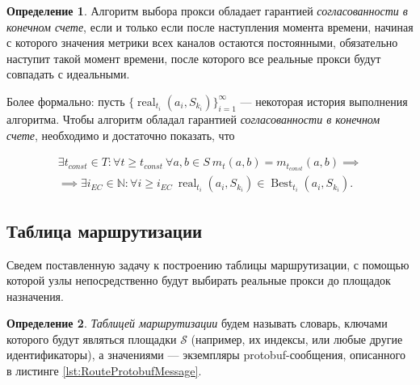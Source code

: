 \documentclass{article}
\theoremstyle{plain}
\theoremstyle{plain}
\theoremstyle{plain}
\theoremstyle{plain}
\theoremstyle{definition}
\newtheorem{definition}{Определение}[section]
\theoremstyle{remark}
\theoremstyle{plain}
\DeclareMathOperator*{\real}{real}
\DeclareMathOperator*{\best}{Best}
\begin{document}
\begin{definition}
\label{EventualConsistencyDefinition}
    Алгоритм выбора прокси обладает гарантией \textit{согласованности в конечном счете}, если и только если после наступления момента времени, начиная с которого значения метрики всех каналов остаются постоянными, обязательно наступит такой момент времени, после которого все реальные прокси будут совпадать с идеальными.
\end{definition}

Более формально: пусть $\{\real_{t_i}(a_i, S_{k_i})\}_{i = 1}^{\infty}$ --- некоторая история выполнения алгоритма. Чтобы алгоритм обладал гарантией \textit{согласованности в конечном счете}, необходимо и достаточно показать, что 

\begin{equation}
\begin{aligned}
    \exists t_{const} \in T \colon \forall t \geq t_{const}\ \forall a, b \in S\ m_t(a, b) = m_{t_{const}}(a, b) \implies \\
    \implies \exists i_{EC} \in \mathbb{N} \colon \forall i \geq i_{EC}\ {\real}_{t_i}(a_i, S_{k_i}) \in {\best}_{t_i}(a_i, S_{k_i}).
\end{aligned}
\end{equation}

\subsection{Таблица маршрутизации}

Сведем поставленную задачу к построению таблицы маршрутизации, с помощью которой узлы непосредственно будут выбирать реальные прокси до площадок назначения.

\begin{definition}
    \textit{Таблицей маршрутизации} будем называть словарь, ключами которого будут являться площадки $\mathcal{S}$ (например, их индексы, или любые другие идентификаторы), а значениями --- экземпляры protobuf-сообщения, описанного в листинге \ref{lst:RouteProtobufMessage}.
\end{definition}
    
    
\end{document}

